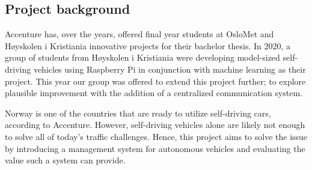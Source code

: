 \subsection{Project background}
Accenture has, over the years, offered final year students at OsloMet and Høyskolen i Kristiania innovative projects for their bachelor thesis. In 2020, a group of students from Høyskolen i Kristiania were developing model-sized self-driving vehicles using Raspberry Pi in conjunction with machine learning as their project. This year our group was offered to extend this project further; to explore plausible improvement with the addition of a centralized communication system.

Norway is one of the countries that are ready to utilize self-driving cars, according to Accenture. However, self-driving vehicles alone are likely not enough to solve all of today's traffic challenges. Hence, this project aims to solve the issue by introducing a management system for autonomous vehicles and evaluating the value such a system can provide.